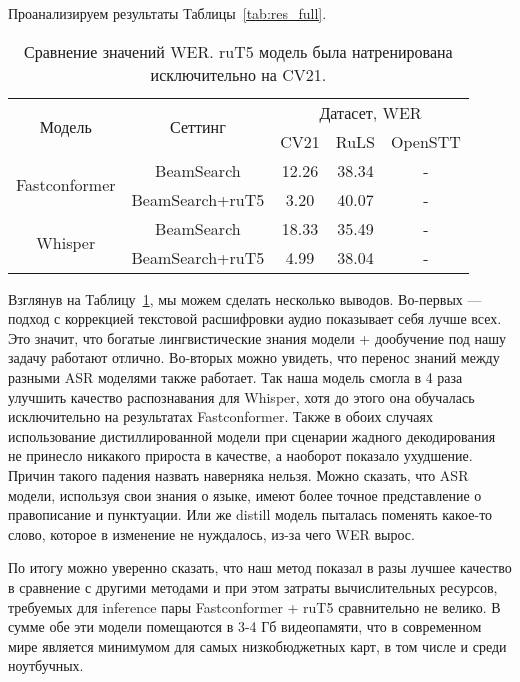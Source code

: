 Проанализируем результаты Таблицы~\ref{tab:res_full}.


\begin{table}[]
\centering
\caption{Сравнение значений WER. ruT5 модель была натренирована исключительно на CV21.}
\begin{tabular}{|c|c|ccc|}
\hline
\multirow{2}{*}{Модель}        & \multirow{2}{*}{Сеттинг}             & \multicolumn{3}{c|}{Датасет, WER}                                    \\ \cline{3-5} 
                               &                                      & \multicolumn{1}{c|}{CV21}  & \multicolumn{1}{c|}{RuLS}     & OpenSTT \\ \hline
\multirow{2}{*}{Fastconformer} & BeamSearch                           & \multicolumn{1}{c|}{12.26} & \multicolumn{1}{c|}{38.34}    & -       \\ \cline{2-5} 
                               & BeamSearch+ruT5                      & \multicolumn{1}{c|}{3.20}  & \multicolumn{1}{c|}{40.07}    & -       \\ \hline
\multirow{2}{*}{Whisper}       & BeamSearch                           & \multicolumn{1}{c|}{18.33} & \multicolumn{1}{c|}{35.49}    & -       \\ \cline{2-5} 
                               & BeamSearch+ruT5                      & \multicolumn{1}{c|}{4.99}  & \multicolumn{1}{c|}{38.04}    & -       \\ \hline
\end{tabular}
\label{tab:res_cv_trained}
\end{table}

Взглянув на Таблицу~\ref{tab:res_cv_trained}, мы можем сделать несколько выводов.
Во-первых — подход с коррекцией текстовой расшифровки аудио показывает себя лучше всех.
Это значит, что богатые лингвистические знания модели + дообучение под нашу задачу работают отлично.
Во-вторых можно увидеть, что перенос знаний между разными ASR моделями также работает.
Так наша модель смогла в 4 раза улучшить качество распознавания для Whisper, хотя до этого она обучалась исключительно на результатах Fastconformer.
Также в обоих случаях использование дистиллированной модели при сценарии жадного декодирования не принесло никакого прироста в качестве, а наоборот показало ухудшение. Причин такого падения назвать наверняка нельзя.
Можно сказать, что ASR модели, используя свои знания о языке, имеют более точное представление о правописание и пунктуации.
Или же distill модель пыталась поменять какое-то слово, которое в изменение не нуждалось, из-за чего WER вырос.

По итогу можно уверенно сказать, что наш метод показал в разы лучшее качество в сравнение с другими методами и при этом затраты вычислительных ресурсов, требуемых для inference пары Fastconformer + ruT5 сравнительно не велико.
В сумме обе эти модели помещаются в 3-4 Гб видеопамяти, что в современном мире является минимумом для самых низкобюджетных карт, в том числе и среди ноутбучных.
